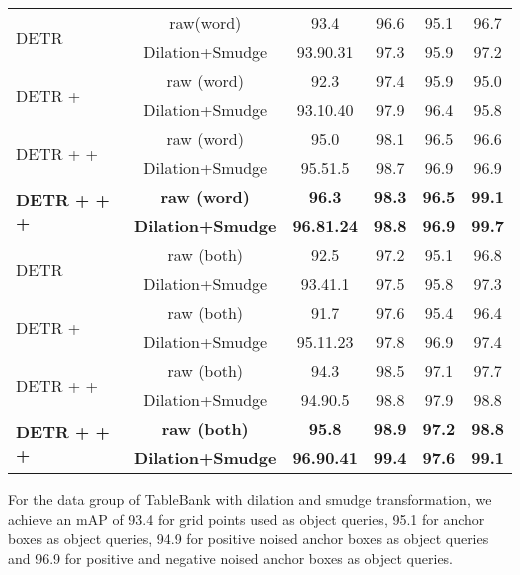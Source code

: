 \documentclass[sn-mathphys]{sn-jnl}\jyear{2021}\theoremstyle{thmstyleone}\newtheorem{theorem}{Theorem}\newtheorem{proposition}[theorem]{Proposition}\theoremstyle{thmstyletwo}\newtheorem{example}{Example}\newtheorem{remark}{Remark}\theoremstyle{thmstylethree}\newtheorem{definition}{Definition}\usepackage{amsmath}
\begin{document}
\begin{table*}
\begin{center}
\begin{tabular*}{\textwidth}{@{\extracolsep{\fill}}lccccc@{\extracolsep{\fill}}}
\multirow{2}{*}{DETR} & raw(word)  & 93.4& 96.6 & 95.1 & 96.7\\
& Dilation+Smudge  & 93.90.31 & 97.3 & 95.9  & 97.2\\
\midrule

\multirow{2}{*}{DETR + } & raw (word) & 92.3 & 97.4 & 95.9  & 95.0\\
& Dilation+Smudge & 93.10.40 & 97.9 & 96.4  & 95.8\\
\midrule

\multirow{2}{*}{DETR +  + } & raw (word) & 95.0 & 98.1 & 96.5 & 96.6 \\
& Dilation+Smudge & 95.51.5 & 98.7 & 96.9 & 96.9\\
\midrule

\multirow{2}{*}{\textbf{DETR +  +  + }} & \textbf{raw (word)} & \textbf{96.3} & \textbf{98.3} & \textbf{96.5} & \textbf{99.1}\\
& \textbf{Dilation+Smudge} & \textbf{96.81.24} & \textbf{98.8}& \textbf{96.9}& \textbf{99.7}\\
\midrule

\multirow{2}{*}{DETR}& raw (both)& 92.5 & 97.2 & 95.1 &  96.8\\
& Dilation+Smudge & 93.41.1 & 97.5 & 95.8 & 97.3\\
\midrule

\multirow{2}{*}{DETR + } & raw (both)& 91.7 & 97.6 & 95.4 & 96.4\\
& Dilation+Smudge & 95.11.23 & 97.8 & 96.9  & 97.4\\
\midrule

\multirow{2}{*}{DETR +  + } & raw (both) & 94.3 & 98.5 & 97.1 & 97.7 \\
& Dilation+Smudge & 94.90.5 & 98.8 & 97.9 & 98.8\\
\midrule

\multirow{2}{*}{\textbf{DETR +  +  + }} & \textbf{raw (both)} & \textbf{95.8} & \textbf{98.9} & \textbf{97.2} & \textbf{98.8}\\
& \textbf{Dilation+Smudge} & \textbf{96.90.41} & \textbf{99.4} & \textbf{97.6} & \textbf{99.1}\\

\bottomrule
\end{tabular*}
\end{center}
\end{table*} 
For the data group of TableBank with dilation and smudge transformation, we achieve an mAP of 93.4 for grid points used as object queries, 95.1 for anchor boxes as object queries, 94.9 for positive noised anchor boxes as object queries and 96.9 for positive and negative noised anchor boxes as object queries. \\
\end{document}
